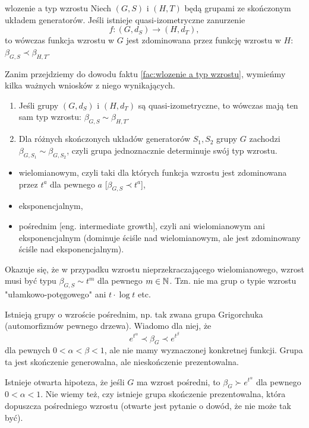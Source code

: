 \begin{fact}{}{wlozenie a typ wzrostu}
  Niech $(G,S)$ i $(H,T)$ będą grupami ze skończonym układem generatorów. Jeśli istnieje quasi-izometryczne zanurzenie 
  $$f:(G, d_S)\to (H, d_T),$$
  to wówczas funkcja wzrostu w $G$ jest zdominowana przez funkcję wzrostu w $H$: $\beta_{G,S}\prec \beta_{H,T}$.
\end{fact}

Zanim przejdziemy do dowodu faktu \ref{fac:wlozenie a typ wzrostu}, wymieńmy kilka ważnych wniosków z niego wynikających.

\begin{conclusion}{}{}
  \begin{enumerate}
    \item Jeśli grupy $(G, d_S)$ i $(H, d_T)$ są quasi-izometryczne, to wówczas mają ten sam typ wzrostu: $\beta_{G,S}\sim\beta_{H,T}$.
    \item Dla różnych skończonych układów generatorów $S_1, S_2$ grupy $G$ zachodzi $\beta_{G, S_1}\sim \beta_{G,S_2}$, czyli grupa jednoznacznie determinuje swój typ wzrostu.
  \end{enumerate}
\end{conclusion}

\begin{itemize}
  \item wielomianowym, czyli taki dla których funkcja wzrostu jest zdominowana przez $t^a$ dla pewnego $a$ [$\beta_{G,S}\prec t^a$],
  \item eksponencjalnym,
  \item pośrednim [eng. intermediate growth], czyli ani wielomianowym ani eksponencjalnym (dominuje ściśle nad wielomianowym, ale jest zdominowany ściśle nad eksponencjalnym).
\end{itemize}

Okazuje się, że w przypadku wzrostu nieprzekraczającego wielomianowego, wzrost musi być typu $\beta_{G,S}\sim t^m$ dla pewnego $m\in\mathbb{N}$. Tzn. nie ma grup o typie wzrostu "ułamkowo-potęgowego" ani $t\cdot\log t$ etc.

Istnieją grupy o wzroście pośrednim, np. tak zwana grupa Grigorchuka (automorfizmów pewnego drzewa). Wiadomo dla niej, że 
$$e^{t^\alpha}\prec \beta_G\prec e^{t^\beta}$$
dla pewnych $0<\alpha<\beta<1$, ale nie mamy wyznaczonej konkretnej funkcji. Grupa ta jest skończenie generowalna, ale nieskończenie prezentowalna.

Istnieje otwarta hipoteza, że jeśli $G$ ma wzrost pośredni, to $\beta_G\succ e^{t^\alpha}$ dla pewnego $0<\alpha<1$. Nie wiemy też, czy istnieje grupa skończenie prezentowalna, która dopuszcza pośredniego wzrostu (otwarte jest pytanie o dowód, że nie może tak być).

